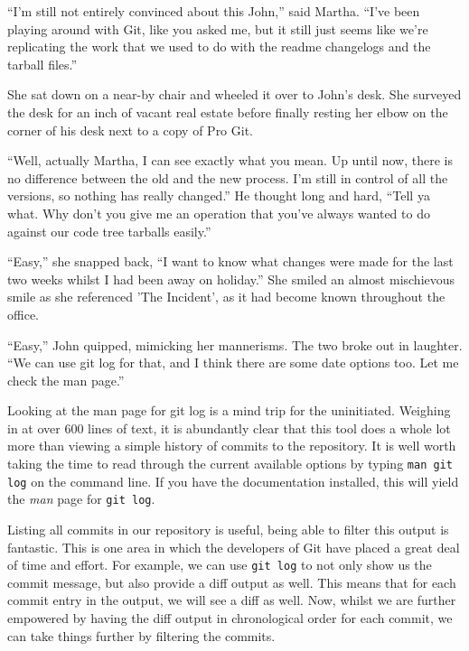 \begin{trenches}
``I'm still not entirely convinced about this John,'' said Martha.  ``I've been playing around with Git, like you asked me, but it still just seems like we're replicating the work that we used to do with the readme changelogs and the tarball files.''

She sat down on a near-by chair and wheeled it over to John's desk.  She surveyed the desk for an inch of vacant real estate before finally resting her elbow on the corner of his desk next to a copy of Pro Git.

``Well, actually Martha, I can see exactly what you mean.  Up until now, there is no difference between the old and the new process.  I'm still in control of all the versions, so nothing has really changed.''  He thought long and hard, ``Tell ya what.  Why don't you give me an operation that you've always wanted to do against our code tree tarballs easily.''

``Easy,'' she snapped back, ``I want to know what changes were made for the last two weeks whilst I had been away on holiday.'' She smiled an almost mischievous smile as she referenced 'The Incident', as it had become known throughout the office.

``Easy,'' John quipped, mimicking her mannerisms.  The two broke out in laughter.  ``We can use git log for that, and I think there are some date options too.  Let me check the man page.''
\end{trenches}

Looking at the man page for git log is a mind trip for the uninitiated.  Weighing in at over 600 lines of text, it is abundantly clear that this tool does a whole lot more than viewing a simple history of commits to the repository.  It is well worth taking the time to read through the current available options by typing \texttt{man git log} on the command line.  If you have the documentation installed, this will yield the \emph{man} page for \texttt{git log}.

Listing all commits in our repository is useful, being able to filter this output is fantastic.  This is one area in which the developers of Git have placed a great deal of time and effort.  For example, we can use \texttt{git log} to not only show us the commit message, but also provide a diff output as well.  This means that for each commit entry in the output, we will see a diff as well.  Now, whilst we are further empowered by having the diff output in chronological order for each commit, we can take things further by filtering the commits.  

